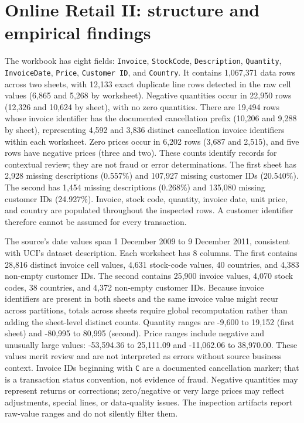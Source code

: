 \documentclass[11pt,a4paper]{article}
\begin{document}
\section{Online Retail II: structure and empirical findings}
The workbook has eight fields: \texttt{Invoice}, \texttt{StockCode}, \texttt{Description}, \texttt{Quantity}, \texttt{InvoiceDate}, \texttt{Price}, \texttt{Customer ID}, and \texttt{Country}. It contains 1,067,371 data rows across two sheets, with 12,133 exact duplicate line rows detected in the raw cell values (6,865 and 5,268 by worksheet). Negative quantities occur in 22,950 rows (12,326 and 10,624 by sheet), with no zero quantities. There are 19,494 rows whose invoice identifier has the documented cancellation prefix (10,206 and 9,288 by sheet), representing 4,592 and 3,836 distinct cancellation invoice identifiers within each worksheet. Zero prices occur in 6,202 rows (3,687 and 2,515), and five rows have negative prices (three and two). These counts identify records for contextual review; they are not fraud or error determinations. The first sheet has 2,928 missing descriptions (0.557\%) and 107,927 missing customer IDs (20.540\%). The second has 1,454 missing descriptions (0.268\%) and 135,080 missing customer IDs (24.927\%). Invoice, stock code, quantity, invoice date, unit price, and country are populated throughout the inspected rows. A customer identifier therefore cannot be assumed for every transaction.

The source's date values span 1 December 2009 to 9 December 2011, consistent with UCI's dataset description. Each worksheet has 8 columns. The first contains 28,816 distinct invoice cell values, 4,631 stock-code values, 40 countries, and 4,383 non-empty customer IDs. The second contains 25,900 invoice values, 4,070 stock codes, 38 countries, and 4,372 non-empty customer IDs. Because invoice identifiers are present in both sheets and the same invoice value might recur across partitions, totals across sheets require global recomputation rather than adding the sheet-level distinct counts. Quantity ranges are -9,600 to 19,152 (first sheet) and -80,995 to 80,995 (second). Price ranges include negative and unusually large values: -53,594.36 to 25,111.09 and -11,062.06 to 38,970.00. These values merit review and are not interpreted as errors without source business context. Invoice IDs beginning with \texttt{C} are a documented cancellation marker; that is a transaction status convention, not evidence of fraud. Negative quantities may represent returns or corrections; zero/negative or very large prices may reflect adjustments, special lines, or data-quality issues. The inspection artifacts report raw-value ranges and do not silently filter them.
\end{document}

